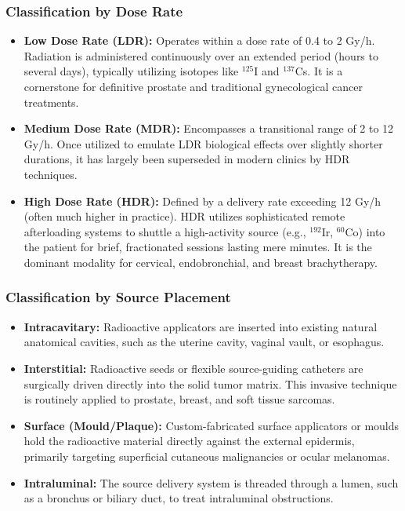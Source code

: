 \subsubsection{Classification by Dose Rate}
\begin{itemize}
    \item \textbf{Low Dose Rate (LDR):} Operates within a dose rate of 0.4 to 2 Gy/h. Radiation is administered continuously over an extended period (hours to several days), typically utilizing isotopes like $^{125}$I and $^{137}$Cs. It is a cornerstone for definitive prostate and traditional gynecological cancer treatments.
    \item \textbf{Medium Dose Rate (MDR):} Encompasses a transitional range of 2 to 12 Gy/h. Once utilized to emulate LDR biological effects over slightly shorter durations, it has largely been superseded in modern clinics by HDR techniques.
    \item \textbf{High Dose Rate (HDR):} Defined by a delivery rate exceeding 12 Gy/h (often much higher in practice). HDR utilizes sophisticated remote afterloading systems to shuttle a high-activity source (e.g., $^{192}$Ir, $^{60}$Co) into the patient for brief, fractionated sessions lasting mere minutes. It is the dominant modality for cervical, endobronchial, and breast brachytherapy.
\end{itemize}

\subsubsection{Classification by Source Placement}
\begin{itemize}
    \item \textbf{Intracavitary:} Radioactive applicators are inserted into existing natural anatomical cavities, such as the uterine cavity, vaginal vault, or esophagus.
    \item \textbf{Interstitial:} Radioactive seeds or flexible source-guiding catheters are surgically driven directly into the solid tumor matrix. This invasive technique is routinely applied to prostate, breast, and soft tissue sarcomas.
    \item \textbf{Surface (Mould/Plaque):} Custom-fabricated surface applicators or moulds hold the radioactive material directly against the external epidermis, primarily targeting superficial cutaneous malignancies or ocular melanomas.
    \item \textbf{Intraluminal:} The source delivery system is threaded through a lumen, such as a bronchus or biliary duct, to treat intraluminal obstructions.
\end{itemize}

